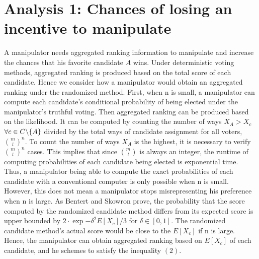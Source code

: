 \documentclass[letterpaper]{article} %
\begin{document}
\section{Analysis 1: Chances of losing an incentive to manipulate}
A manipulator needs aggregated ranking information to manipulate and increase the chances that his favorite candidate $A$ wins. Under deterministic voting methods, aggregated ranking is produced based on the total score of each candidate. Hence we consider how a manipulator would obtain an aggregated ranking under the randomized method. First, when n is small, a manipulator can compute each candidate's conditional probability of being elected under the manipulator's truthful voting. Then aggregated ranking can be produced based on the likelihood. It can be computed by counting the number of ways $X_A > X_c$
$\forall c \in C \symbol{92}\text{\{} A\text{\}}$ divided by the total ways of candidate assignment for all voters, $\binom{m}{l}^n$. To count the number of ways $X_A$ is the highest, it is necessary to verify $\binom{m}{l}^n $ cases. This implies that since $\binom{m}{l}$ is always an integer, the runtime of computing probabilities of each candidate being elected is exponential time. Thus, a manipulator being able to compute the exact probabilities of each candidate with a conventional computer is only possible when n is small.\\
However, this does not mean a manipulator stops misrepresenting his preference when n is large. As Bentert and Skowron prove, the probability that the score computed by the randomized candidate method differs from its expected score is upper bounded by $2\cdot\exp{-\delta^2E[X_c]/3}$ for $\delta \in [0,1]$. The randomized candidate method's actual score would be close to the $E[X_c]$ if n is large. Hence, the manipulator can obtain aggregated ranking based on $E[X_c]$ of each candidate, and he schemes to satisfy the inequality $(2)$.
\end{document}
